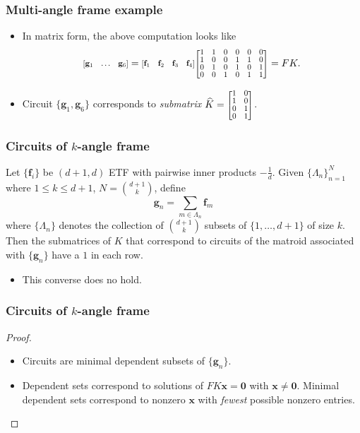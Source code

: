\documentclass{beamer}
\renewcommand{\vec}[1]{\mathbf{#1}}
\newcommand{\ivec}[2][.8]{%
  \scalebox{#1}{%
    \renewcommand{\arraystretch}{.8}%
    $\begin{bmatrix}#2\end{bmatrix}$%
  }
}
\begin{document}
{\begin{frame}
    \frametitle{Multi-angle frame example}
    \begin{itemize}
    \item <1-> In matrix form, the above computation looks like
    \[
    \ivec{\vec{g}_1 & \ldots & \vec{g}_6}
    = \ivec{\vec{f}_1 & \vec{f}_2 & \vec{f}_3 & \vec{f}_4}\ivec{1 & 1 & 0 & 0 & 0 & 0\\ 1 & 0 & 0 & 1 & 1 & 0 \\ 0 & 1 & 0 & 1 & 0 & 1 \\ 0 & 0 & 1 & 0 & 1 & 1} = FK.
    \]
    \item <2-> Circuit $\{\vec{g}_1, \vec{g}_6\}$ corresponds to \textit{submatrix} $\widehat{K} = \ivec{1 & 0 \\ 1 & 0 \\ 0 & 1 \\ 0 & 1}$.
    \end{itemize}
\end{frame}

\begin{frame}
    \frametitle{Circuits of $k$-angle frame}
    \begin{theorem}
        Let $\{\vec{f}_i\}$ be $(d+1,d)$ ETF with pairwise inner products $-\frac{1}{d}$.
        Given $\{\Lambda_n\}_{n=1}^{N}$ where $1\leq k\leq d+1$, $N = \binom{d+1}{k}$, define
        \[
            \vec{g}_n = \sum_{m\in\Lambda_n}\vec{f}_m
        \]
        where $\{\Lambda_n\}$ denotes the collection of $\binom{d+1}{k}$ subsets of $\{1,\ldots, d+1\}$ of size $k$.
        Then the submatrices of $K$ that correspond to circuits of the matroid associated with $\{\vec{g}_n\}$ have a $1$ in each row.
    \end{theorem}
    \begin{itemize}
        \item This converse does no hold.
    \end{itemize}
\end{frame}
\begin{frame}
    \frametitle{Circuits of $k$-angle frame}
    \begin{proof}
        \begin{itemize}
            \item <1-> Circuits are minimal dependent subsets of $\{\vec{g}_n\}$.

            \item <2-> Dependent sets correspond to solutions of $FK\vec{x} = \vec{0}$ with $\vec{x}\neq\vec{0}$.
            Minimal dependent sets correspond to nonzero $\vec{x}$ with \textit{fewest} possible nonzero entries.


\end{itemize}
\end{proof}
\end{frame}}
\end{document}
